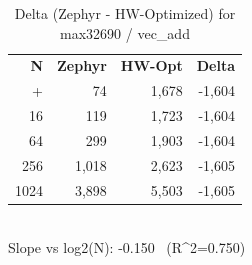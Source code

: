 \begin{table}[tb]
    \centering
    \caption{Delta (Zephyr - HW-Optimized) for max32690 / vec_add}
    \label{tab:delta_max32690_vec_add}
    \scriptsize
    \begin{tabular}{r r r r}
        \hline
        \textbf{N} & \textbf{Zephyr} & \textbf{HW-Opt} & \textbf{Delta} \\\n+        \hline
        4 & 74 & 1,678 & -1,604\\
        16 & 119 & 1,723 & -1,604\\
        64 & 299 & 1,903 & -1,604\\
        256 & 1,018 & 2,623 & -1,605\\
        1024 & 3,898 & 5,503 & -1,605\\
        \hline
    \end{tabular}
    \vspace{2mm}\\\n    Slope vs log2(N): -0.150 \ (R^2=0.750)\n\end{table}
